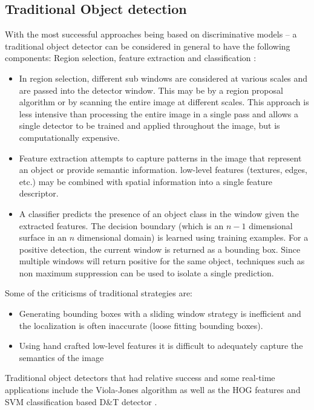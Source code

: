 \documentclass[a4paper,twoside,12pt]{report}
\begin{document}
\subsection{Traditional Object detection}

With the most successful approaches being based on discriminative models -- a traditional object detector can be considered in general to have the following components:  Region selection, feature extraction and classification \citep{deepreview}:

\begin{itemize}
    \item In region selection, different sub windows are considered at various scales and are passed into the detector window. This may be by a region proposal algorithm or by scanning the entire image at different scales. This approach is less intensive than processing the entire image in a single pass and allows a single detector to be trained and applied throughout the image, but is computationally expensive. 
    \item Feature extraction attempts to capture patterns in the image that represent an object or provide semantic information. low-level features (textures, edges, etc.) may be combined with spatial information into a single feature descriptor.
    \item A classifier predicts the presence of an object class in the window given the extracted features. The decision boundary (which is an $n-1$ dimensional surface in an $n$ dimensional domain) is learned using training examples. For a positive detection, the current window is returned as a bounding box. Since multiple windows will return positive for the same object, techniques such as non maximum suppression can be used to isolate a single prediction.
\end{itemize}

\noindent Some of the criticisms of traditional strategies are: 
\begin{itemize}
    \setlength\itemsep{0em}
    \item Generating bounding boxes with a sliding window strategy is inefficient and the localization is often inaccurate (loose fitting bounding boxes).
    \item Using hand crafted low-level features it is difficult to adequately capture the semantics of the image 
\end{itemize}

Traditional object detectors that had relative success and some real-time applications include the Viola-Jones algorithm \citep{vjdet} as well as the HOG features and SVM classification based D\&T detector \citep{hog}. 
\end{document}
